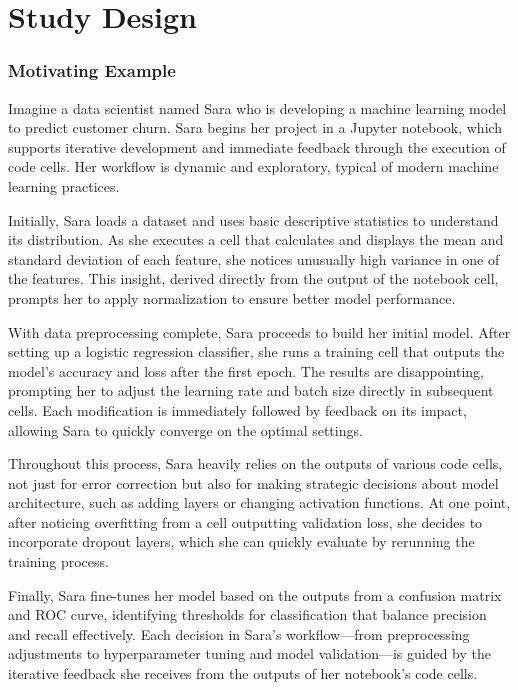 \section{Study Design}

\subsubsection{Motivating Example}

Imagine a data scientist named Sara who is developing a machine learning model to predict customer churn. Sara begins her project in a Jupyter notebook, which supports iterative development and immediate feedback through the execution of code cells. Her workflow is dynamic and exploratory, typical of modern machine learning practices.

Initially, Sara loads a dataset and uses basic descriptive statistics to understand its distribution. As she executes a cell that calculates and displays the mean and standard deviation of each feature, she notices unusually high variance in one of the features. This insight, derived directly from the output of the notebook cell, prompts her to apply normalization to ensure better model performance.

With data preprocessing complete, Sara proceeds to build her initial model. After setting up a logistic regression classifier, she runs a training cell that outputs the model's accuracy and loss after the first epoch. The results are disappointing, prompting her to adjust the learning rate and batch size directly in subsequent cells. Each modification is immediately followed by feedback on its impact, allowing Sara to quickly converge on the optimal settings.

Throughout this process, Sara heavily relies on the outputs of various code cells, not just for error correction but also for making strategic decisions about model architecture, such as adding layers or changing activation functions. At one point, after noticing overfitting from a cell outputting validation loss, she decides to incorporate dropout layers, which she can quickly evaluate by rerunning the training process.

Finally, Sara fine-tunes her model based on the outputs from a confusion matrix and ROC curve, identifying thresholds for classification that balance precision and recall effectively. Each decision in Sara's workflow—from preprocessing adjustments to hyperparameter tuning and model validation—is guided by the iterative feedback she receives from the outputs of her notebook's code cells.

